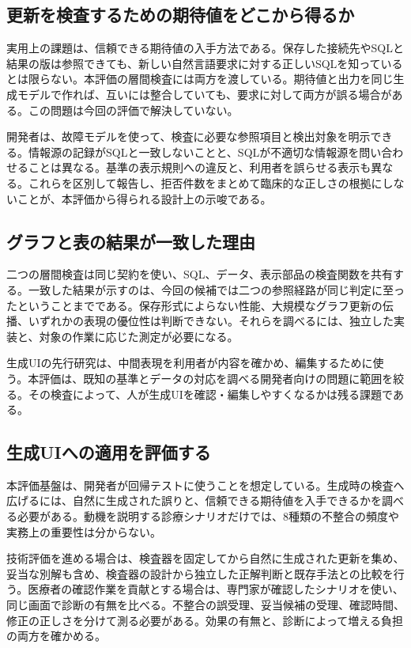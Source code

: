 \documentclass[manuscript,review,anonymous]{acmart}
\begin{document}
\subsection{更新を検査するための期待値をどこから得るか}

実用上の課題は、信頼できる期待値の入手方法である。保存した接続先やSQLと結果の版は参照できても、新しい自然言語要求に対する正しいSQLを知っているとは限らない。本評価の層間検査には両方を渡している。期待値と出力を同じ生成モデルで作れば、互いには整合していても、要求に対して両方が誤る場合がある。この問題は今回の評価で解決していない。

開発者は、故障モデルを使って、検査に必要な参照項目と検出対象を明示できる。情報源の記録がSQLと一致しないことと、SQLが不適切な情報源を問い合わせることは異なる。基準の表示規則への違反と、利用者を誤らせる表示も異なる。これらを区別して報告し、拒否件数をまとめて臨床的な正しさの根拠にしないことが、本評価から得られる設計上の示唆である。

\subsection{グラフと表の結果が一致した理由}

二つの層間検査は同じ契約を使い、SQL、データ、表示部品の検査関数を共有する。一致した結果が示すのは、今回の候補では二つの参照経路が同じ判定に至ったということまでである。保存形式によらない性能、大規模なグラフ更新の伝播、いずれかの表現の優位性は判断できない。それらを調べるには、独立した実装と、対象の作業に応じた測定が必要になる。

生成UIの先行研究は、中間表現を利用者が内容を確かめ、編集するために使う\cite{cao2025jelly,park2026bridging,kaputa2026simstep}。本評価は、既知の基準とデータの対応を調べる開発者向けの問題に範囲を絞る。その検査によって、人が生成UIを確認・編集しやすくなるかは残る課題である。

\subsection{生成UIへの適用を評価する}

本評価基盤は、開発者が回帰テストに使うことを想定している。生成時の検査へ広げるには、自然に生成された誤りと、信頼できる期待値を入手できるかを調べる必要がある。動機を説明する診療シナリオだけでは、8種類の不整合の頻度や実務上の重要性は分からない。

技術評価を進める場合は、検査器を固定してから自然に生成された更新を集め、妥当な別解も含め、検査器の設計から独立した正解判断と既存手法との比較を行う。医療者の確認作業を貢献とする場合は、専門家が確認したシナリオを使い、同じ画面で診断の有無を比べる。不整合の誤受理、妥当候補の受理、確認時間、修正の正しさを分けて測る必要がある。効果の有無と、診断によって増える負担の両方を確かめる。
\end{document}
